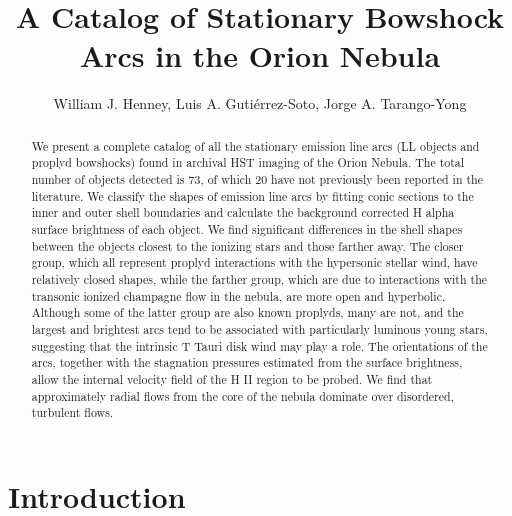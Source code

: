 \documentclass{emulateapj}
\begin{document}
\title{
  A Catalog of Stationary Bowshock Arcs in the Orion Nebula
}
\author{
  William J. Henney, 
  Luis A. Gutiérrez-Soto,
  Jorge A. Tarango-Yong 
}

\begin{abstract}
We present a complete catalog of all the stationary emission line arcs (LL objects and proplyd bowshocks) found in archival HST imaging of the Orion Nebula.   The total number of objects detected is 73, of which 20 have not previously been reported in the literature.  We classify the shapes of emission line arcs by fitting conic sections to the inner and outer shell boundaries and calculate the background corrected H alpha surface brightness of each object.   We find significant differences in the shell shapes between the objects closest to the ionizing stars and those farther away.  The closer group, which all represent proplyd interactions with the hypersonic stellar wind, have relatively closed shapes, while the farther group, which are due to interactions with the transonic ionized champagne flow in the nebula, are more open and hyperbolic.  Although some of the latter group are also known proplyds, many are not, and the largest and brightest arcs tend to be associated with particularly luminous young stars, suggesting that the intrinsic T Tauri disk wind may play a role.  The orientations of the arcs, together with the stagnation pressures estimated from the surface brightness, allow the internal velocity field of the H II region to be probed.  We find that approximately radial flows from the core of the nebula dominate over disordered, turbulent flows.
\end{abstract}

\section{Introduction}
\label{sec:intro}
\end{document}
